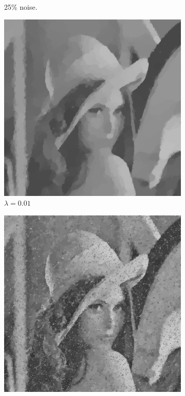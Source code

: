 \documentclass[abstracton]{scrreprt}
\begin{document}
\begin{figure}[!ht]
\begin{subfigure}[b]{0.24\textwidth}
                    \caption{25\% noise.}
                \end{subfigure}
                \begin{subfigure}[b]{0.24\textwidth}
                    \includegraphics[width=\textwidth]{img/denoising/salt_and_pepper_noise/001lena.png}
                    \caption{$\lambda = 0.01$}
                \end{subfigure}
                \begin{subfigure}[b]{0.24\textwidth}
                    \includegraphics[width=\textwidth]{img/denoising/salt_and_pepper_noise/002lena.png}

\end{subfigure}
\end{figure}
\end{document}
